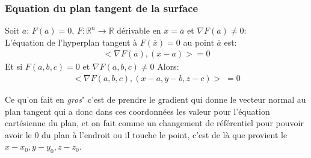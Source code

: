 \subsubsection{Equation du plan tangent de la surface}
\begin{definition}
    Soit $\overline{a}$: $F( \overline{a}) = 0$, $F: \mathbb{R}^n  \to \mathbb{R}$ dérivable en $\overline{x} = \overline{a}$ et $ \nabla F( \overline{a}) \neq 0$:\\
   L'équation de l'hyperplan tangent à $F( \overline{x}) = 0$ au point $\overline{a}$ est:
   \begin{align*}
       < \nabla F( \overline{a}),  ( \overline{x} - \overline{a}) > = 0
   \end{align*}
   Et si $F(a, b, c) = 0$ et $ \nabla F(a, b, c) \neq 0$ Alors:
   \begin{align*}
       < \nabla F(a, b, c), (x-a, y-b, z-c) >\; = 0
   \end{align*}
   
  
   
\end{definition}
\begin{framedremark}
    Ce qu'on fait en \textit{gros}" c'est de prendre le gradient qui donne le vecteur normal au plan tangent qui a donc dans ces coordonnées les valeur pour l'équation cartésienne du plan, et on fait comme un changement de référentiel pour pouvoir avoir le $0$ du plan à l'endroit ou il touche le point, c'est de là que provient le $x - x_0, y - y_0, z - z_0$.
\end{framedremark}





